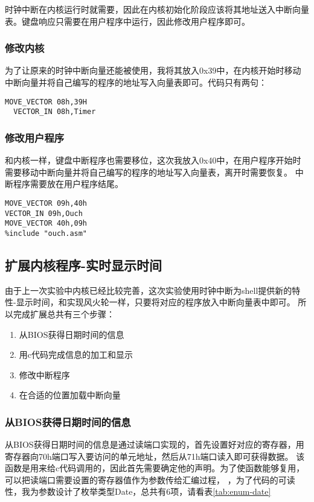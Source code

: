 \documentclass[a4paper, 11pt]{article} %
\begin{document}
时钟中断在内核运行时就需要，因此在内核初始化阶段应该将其地址送入中断向量表。键盘响应只需要在用户程序中运行，因此修改用户程序即可。

\subsubsection{修改内核}

为了让原来的时钟中断向量还能被使用，我将其放入0x39中，在内核开始时移动中断向量并将自己编写的程序的地址写入向量表即可。代码只有两句：
\begin{lstlisting}[language={[x86masm]Assembler},label=kernelChange,caption=内核程序更改]
  MOVE_VECTOR 08h,39H
  VECTOR_IN 08h,Timer
\end{lstlisting}
\subsubsection{修改用户程序}

和内核一样，键盘中断程序也需要移位，这次我放入0x40中，在用户程序开始时需要移动中断向量并将自己编写的程序的地址写入向量表，离开时需要恢复。
中断程序需要放在用户程序结尾。

\begin{lstlisting}[language={[x86masm]Assembler},label=userChange,caption=用户程序更改]
MOVE_VECTOR 09h,40h
VECTOR_IN 09h,Ouch
MOVE_VECTOR 40h,09h
%include "ouch.asm"
\end{lstlisting}

\subsection{扩展内核程序-实时显示时间}
由于上一次实验中内核已经比较完善，这次实验使用时钟中断为shell提供新的特性-显示时间，和实现风火轮一样，只要将对应的程序放入中断向量表中即可。
所以完成扩展总共有三个步骤：
\begin{enumerate}
  \item 从BIOS获得日期时间的信息
  \item 用c代码完成信息的加工和显示
  \item 修改中断程序
  \item 在合适的位置加载中断向量
\end{enumerate}

\subsubsection{从BIOS获得日期时间的信息}
从BIOS获得日期时间的信息是通过读端口实现的，首先设置好对应的寄存器，用寄存器向70h端口写入要访问的单元地址，然后从71h端口读入即可获得数据。
该函数是用来给c代码调用的，因此首先需要确定他的声明。为了使函数能够复用，可以把读端口需要设置的寄存器值作为参数传给汇编过程，
，为了代码的可读性，我为参数设计了枚举类型Date，总共有6项，请看表\ref{tab:enum-date}
\FloatBarrier
\end{document}
